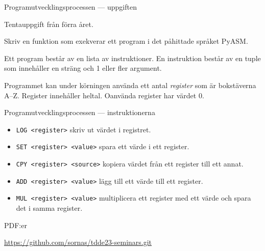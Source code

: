 \documentclass{beamer}
\begin{document}
  \begin{frame}{Programutvecklingsprocessen --- uppgiften}

    Tentauppgift från förra året.

    \pause{}

    Skriv en funktion som exekverar ett program i det påhittade språket PyASM.

    Ett program består av en lista av instruktioner. En instruktion består av en
    tuple som innehåller en sträng och 1 eller fler argument.

    Programmet kan under körningen använda ett antal \emph{register} som är
    bokstäverna A--Z. Register innehåller heltal. Oanvända register har värdet
    0.

  \end{frame}

  \begin{frame}{Programutvecklingsprocessen --- instruktionerna}

    \begin{itemize}
      \item \texttt{LOG <register>} skriv ut värdet i registret.
      \item \texttt{SET <register> <value>} spara ett värde i ett register.
      \item \texttt{CPY <register> <source>} kopiera värdet från ett register till ett annat.
      \item \texttt{ADD <register> <value>} lägg till ett värde till ett register.
      \item \texttt{MUL <register> <value>} multiplicera ett register med ett värde och spara det i samma register.
    \end{itemize}

  \end{frame}

  \begin{frame}{PDF:er}

    \url{https://github.com/sornas/tdde23-seminars.git}

  \end{frame}
\end{document}
